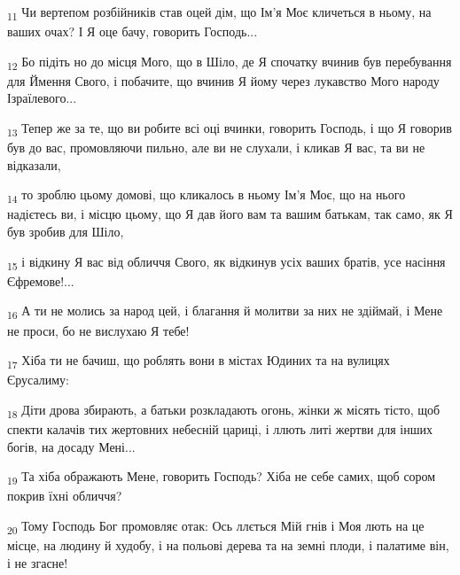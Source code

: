 \begin{tcolorbox}
\textsubscript{11} Чи вертепом розбійників став оцей дім, що Ім'я Моє кличеться в ньому, на ваших очах? І Я оце бачу, говорить Господь...
\end{tcolorbox}
\begin{tcolorbox}
\textsubscript{12} Бо підіть но до місця Мого, що в Шіло, де Я спочатку вчинив був перебування для Ймення Свого, і побачите, що вчинив Я йому через лукавство Мого народу Ізраїлевого...
\end{tcolorbox}
\begin{tcolorbox}
\textsubscript{13} Тепер же за те, що ви робите всі оці вчинки, говорить Господь, і що Я говорив був до вас, промовляючи пильно, але ви не слухали, і кликав Я вас, та ви не відказали,
\end{tcolorbox}
\begin{tcolorbox}
\textsubscript{14} то зроблю цьому домові, що кликалось в ньому Ім'я Моє, що на нього надієтесь ви, і місцю цьому, що Я дав його вам та вашим батькам, так само, як Я був зробив для Шіло,
\end{tcolorbox}
\begin{tcolorbox}
\textsubscript{15} і відкину Я вас від обличчя Свого, як відкинув усіх ваших братів, усе насіння Єфремове!...
\end{tcolorbox}
\begin{tcolorbox}
\textsubscript{16} А ти не молись за народ цей, і благання й молитви за них не здіймай, і Мене не проси, бо не вислухаю Я тебе!
\end{tcolorbox}
\begin{tcolorbox}
\textsubscript{17} Хіба ти не бачиш, що роблять вони в містах Юдиних та на вулицях Єрусалиму:
\end{tcolorbox}
\begin{tcolorbox}
\textsubscript{18} Діти дрова збирають, а батьки розкладають огонь, жінки ж місять тісто, щоб спекти калачів тих жертовних небесній цариці, і ллють литі жертви для інших богів, на досаду Мені...
\end{tcolorbox}
\begin{tcolorbox}
\textsubscript{19} Та хіба ображають Мене, говорить Господь? Хіба не себе самих, щоб сором покрив їхні обличчя?
\end{tcolorbox}
\begin{tcolorbox}
\textsubscript{20} Тому Господь Бог промовляє отак: Ось ллється Мій гнів і Моя лють на це місце, на людину й худобу, і на польові дерева та на земні плоди, і палатиме він, і не згасне!
\end{tcolorbox}
